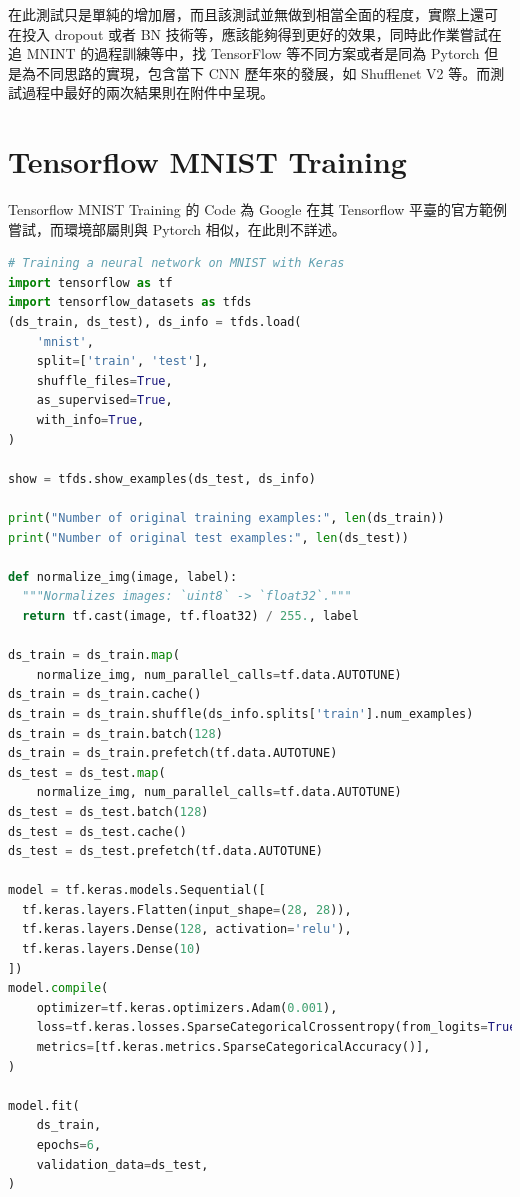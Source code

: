 \documentclass[11pt,UTF8]{ctexart}
\begin{document}
在此測試只是單純的增加層，而且該測試並無做到相當全面的程度，實際上還可 在投入 dropout 或者 BN 技術等，應該能夠得到更好的效果，同時此作業嘗試在追 MNINT 的過程訓練等中，找 TensorFlow 等不同方案或者是同為 Pytorch 但是為不同思路的實現，包含當下 CNN 歷年來的發展，如  Shufflenet V2 等。而測試過程中最好的兩次結果則在附件中呈現。

\newpage

\section{Tensorflow MNIST Training}

Tensorflow MNIST Training 的 Code 為 Google 在其 Tensorflow 平臺的官方範例嘗試，而環境部屬則與 Pytorch 相似，在此則不詳述。

	\begin{lstlisting}[language={python}]
# Training a neural network on MNIST with Keras
import tensorflow as tf
import tensorflow_datasets as tfds
(ds_train, ds_test), ds_info = tfds.load(
    'mnist',
    split=['train', 'test'],
    shuffle_files=True,
    as_supervised=True,
    with_info=True,
)

show = tfds.show_examples(ds_test, ds_info)

print("Number of original training examples:", len(ds_train))
print("Number of original test examples:", len(ds_test))

def normalize_img(image, label):
  """Normalizes images: `uint8` -> `float32`."""
  return tf.cast(image, tf.float32) / 255., label

ds_train = ds_train.map(
    normalize_img, num_parallel_calls=tf.data.AUTOTUNE)
ds_train = ds_train.cache()
ds_train = ds_train.shuffle(ds_info.splits['train'].num_examples)
ds_train = ds_train.batch(128)
ds_train = ds_train.prefetch(tf.data.AUTOTUNE)
ds_test = ds_test.map(
    normalize_img, num_parallel_calls=tf.data.AUTOTUNE)
ds_test = ds_test.batch(128)
ds_test = ds_test.cache()
ds_test = ds_test.prefetch(tf.data.AUTOTUNE)

model = tf.keras.models.Sequential([
  tf.keras.layers.Flatten(input_shape=(28, 28)),
  tf.keras.layers.Dense(128, activation='relu'),
  tf.keras.layers.Dense(10)
])
model.compile(
    optimizer=tf.keras.optimizers.Adam(0.001),
    loss=tf.keras.losses.SparseCategoricalCrossentropy(from_logits=True),
    metrics=[tf.keras.metrics.SparseCategoricalAccuracy()],
)

model.fit(
    ds_train,
    epochs=6,
    validation_data=ds_test,
)
	\end{lstlisting}
\end{document}
